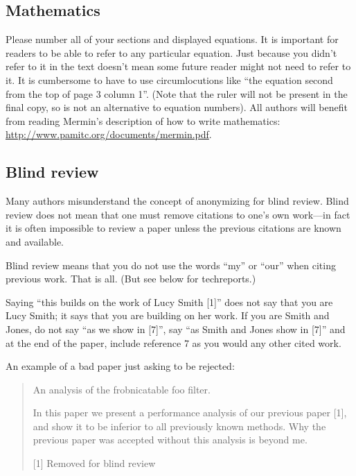 \subsection{Mathematics}
Please number all of your sections and displayed equations.
It is important for readers to be able to refer to any particular equation.
Just because you didn't refer to it in the text doesn't mean some future reader might not need to refer to it.
It is cumbersome to have to use circumlocutions like ``the equation second from the top of page 3 column 1''. 
(Note that the ruler will not be present in the final copy, so is not an alternative to equation numbers). 
All authors will benefit from reading Mermin's description of how to write mathematics:
\url{http://www.pamitc.org/documents/mermin.pdf}.

\subsection{Blind review}
Many authors misunderstand the concept of anonymizing for blind review.
Blind review does not mean that one must remove citations to one's own work---in fact it is often impossible to review a paper unless the previous citations are known and available.

Blind review means that you do not use the words ``my'' or ``our'' when citing previous work.
That is all.
(But see below for techreports.)

Saying ``this builds on the work of Lucy Smith [1]'' does not say that you are Lucy Smith; it says that you are building on her work. 
If you are Smith and Jones, do not say ``as we show in [7]'', say ``as Smith and Jones show in [7]'' and at the end of the paper, include reference 7 as you would any other cited work.

An example of a bad paper just asking to be rejected:
\begin{quote}
\begin{center}
An analysis of the frobnicatable foo filter.
\end{center}

In this paper we present a performance analysis of our previous paper [1], and show it to be inferior to all previously known methods.
Why the previous paper was accepted without this analysis is beyond me.

[1] Removed for blind review
\end{quote}

